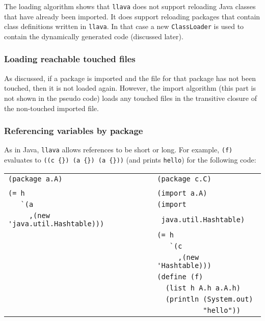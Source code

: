 \documentclass{acm-final/sig-alternate-modified}
\begin{document}
The loading algorithm shows that {\tt llava} does not support
reloading Java classes that have already been imported.  It does
support reloading packages that contain class definitions written in
{\tt llava}.  In that case a new {\tt ClassLoader} is used to contain
the dynamically generated code (discussed later).

\subsubsection{Loading reachable touched files}

As discussed, if a package is imported and the file for that package
has not been touched, then it is not loaded again.  However, the
import algorithm (this part is not shown in the pseudo code) loads any
touched files in the transitive closure of the non-touched imported
file.

\subsubsection{Referencing variables by package}

As in Java, {\tt llava} allows references to be short or long.  For
example, {\tt (f)} evaluates to \verb+((c {}) (a {}) (a {}))+ (and
prints {\tt hello}) for the following code:

\scriptsize
\begin{tabular}{l|l}
\verb+(package a.A)+                                   & \verb+(package c.C)+ \\
                                                       &                     \\
\verb+(= h+                                            & \verb+(import a.A)+ \\
\verb+   `(a+                                          & \verb+(import+ \\
\verb+     ,(new 'java.util.Hashtable)))+              & \verb+ java.util.Hashtable)+ \\
                                                       & \verb+(= h+ \\
                                                       & \verb+   `(c+ \\
                                                       & \verb+     ,(new 'Hashtable)))+ \\
                                                       & \verb+(define (f)+ \\
                                                       & \verb+  (list h A.h a.A.h)+ \\
                                                       & \verb+  (println (System.out)+ \\
                                                       & \verb+           "hello"))+ \\
\end{tabular}
\normalsize
\end{document}
